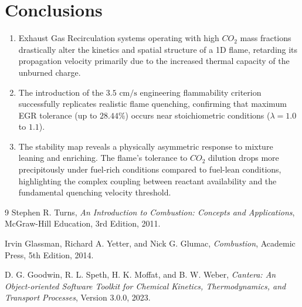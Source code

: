 \documentclass[11pt,a4paper]{article}
\begin{document}
\section{Conclusions}
\begin{enumerate}
    \item Exhaust Gas Recirculation systems operating with high $CO_2$ mass fractions drastically alter the kinetics and spatial structure of a 1D flame, retarding its propagation velocity primarily due to the increased thermal capacity of the unburned charge.
    \item The introduction of the $3.5 \text{ cm/s}$ engineering flammability criterion successfully replicates realistic flame quenching, confirming that maximum EGR tolerance (up to $28.44\%$) occurs near stoichiometric conditions ($\lambda = 1.0$ to $1.1$).
    \item The stability map reveals a physically asymmetric response to mixture leaning and enriching. The flame's tolerance to $CO_2$ dilution drops more precipitously under fuel-rich conditions compared to fuel-lean conditions, highlighting the complex coupling between reactant availability and the fundamental quenching velocity threshold.
\end{enumerate}
\vspace{1cm}
\begin{thebibliography}{9}
Stephen R. Turns,
\textit{An Introduction to Combustion: Concepts and Applications},
McGraw-Hill Education, 3rd Edition, 2011.

Irvin Glassman, Richard A. Yetter, and Nick G. Glumac,
\textit{Combustion},
Academic Press, 5th Edition, 2014.

D. G. Goodwin, R. L. Speth, H. K. Moffat, and B. W. Weber,
\textit{Cantera: An Object-oriented Software Toolkit for Chemical Kinetics, Thermodynamics, and Transport Processes}, Version 3.0.0, 2023.
\end{thebibliography}
\end{document}
